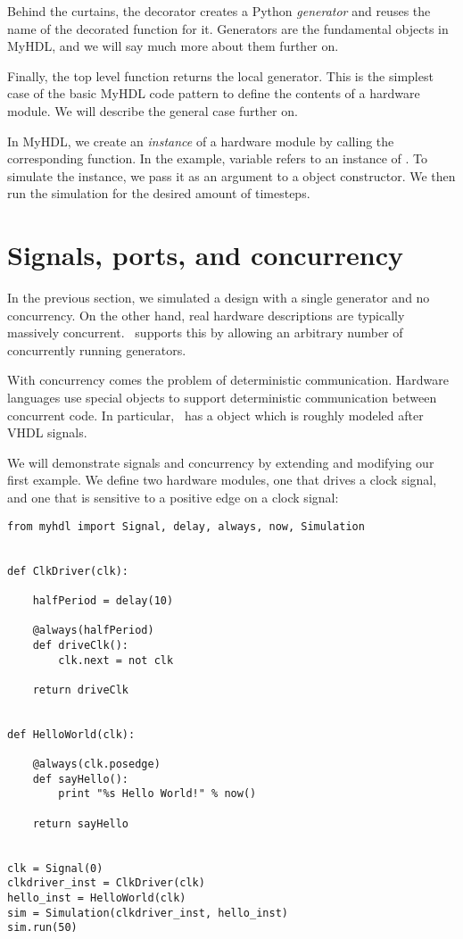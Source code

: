 Behind the curtains, the  decorator creates a Python
\emph{generator} and reuses the name of the decorated function for
it. Generators are the fundamental objects in MyHDL, and we will say
much more about them further on.

Finally, the top level function returns the local generator. This is
the simplest case of the basic MyHDL code pattern
to define the contents of a hardware module. We will describe the
general case further on.

In MyHDL, we create an \emph{instance} of a hardware module by calling
the corresponding function. In the example, variable  refers
to an instance of .  To simulate the instance, we
pass it as an argument to a  object constructor.  We
then run the simulation for the desired amount of timesteps.

\section{Signals, ports, and concurrency \label{intro-conc}}

In the previous section, we simulated a design with a single
generator and no concurrency. On the other hand, real hardware
descriptions are typically massively concurrent.
\myhdl\ supports this by allowing an
arbitrary number of concurrently running generators. 

With concurrency comes the problem of deterministic
communication. Hardware languages use special objects to
support deterministic communication between concurrent code.
In particular, \myhdl\ 
has a  object which is roughly modeled after VHDL
signals.

We will demonstrate signals and concurrency
by extending and modifying our first example. We define two hardware
modules, one that drives a clock signal, and one that is sensitive
to a positive edge on a clock signal:


\begin{verbatim}
from myhdl import Signal, delay, always, now, Simulation


def ClkDriver(clk):

    halfPeriod = delay(10)

    @always(halfPeriod)
    def driveClk():
        clk.next = not clk

    return driveClk


def HelloWorld(clk):
    
    @always(clk.posedge)
    def sayHello():
        print "%s Hello World!" % now()

    return sayHello


clk = Signal(0)
clkdriver_inst = ClkDriver(clk)
hello_inst = HelloWorld(clk)
sim = Simulation(clkdriver_inst, hello_inst)
sim.run(50)
\end{verbatim}

